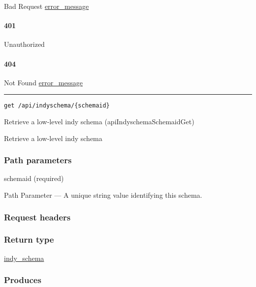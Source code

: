 Bad Request \protect\hyperlink{error_message}{error\_message}

\hypertarget{section-527}{%
\paragraph{401}\label{section-527}}

Unauthorized \protect\hyperlink{}{}

\hypertarget{section-528}{%
\paragraph{404}\label{section-528}}

Not Found \protect\hyperlink{error_message}{error\_message}

\begin{center}\rule{0.5\linewidth}{\linethickness}\end{center}

\protect\hypertarget{apiIndyschemaSchemaidGet}{}{}

\begin{verbatim}
get /api/indyschema/{schemaid}
\end{verbatim}

Retrieve a low-level indy schema ({apiIndyschemaSchemaidGet})

Retrieve a low-level indy schema

\hypertarget{path-parameters-88}{%
\subsubsection{Path parameters}\label{path-parameters-88}}

schemaid (required)

{Path Parameter} --- A unique string value identifying this schema.

\hypertarget{request-headers-87}{%
\subsubsection{Request headers}\label{request-headers-87}}

\hypertarget{return-type-125}{%
\subsubsection{Return type}\label{return-type-125}}

\protect\hyperlink{indy_schema}{indy\_schema}

\hypertarget{produces-159}{%
\subsubsection{Produces}\label{produces-159}}

